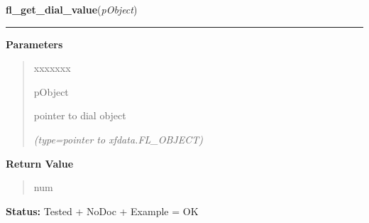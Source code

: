 \hspace{.8\funcindent}\begin{boxedminipage}{\funcwidth}

    \raggedright \textbf{fl\_get\_dial\_value}(\textit{pObject})

    \vspace{-1.5ex}

    \rule{\textwidth}{0.5\fboxrule}
\setlength{\parskip}{2ex}
\setlength{\parskip}{1ex}
      \textbf{Parameters}
      \vspace{-1ex}

      \begin{quote}
        \begin{Ventry}{xxxxxxx}

          \item[pObject]

          pointer to dial object

            {\it (type=pointer to xfdata.FL\_OBJECT)}

        \end{Ventry}

      \end{quote}

      \textbf{Return Value}
    \vspace{-1ex}

      \begin{quote}
      num

      \end{quote}

\textbf{Status:} Tested + NoDoc + Example = OK



    \end{boxedminipage}

    \label{xformslib:library:fl_set_dial_bounds}

    \vspace{0.5ex}

